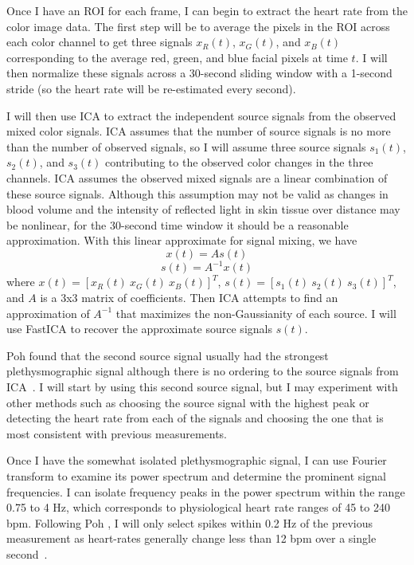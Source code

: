 \documentclass[12pt,twocolumn,letterpaper]{article}
\begin{document}
Once I have an ROI for each frame, I can begin to extract the heart rate from the color image data. The first step will be to average the pixels in the ROI across each color channel to get three signals $x_R(t)$, $x_G(t)$, and $x_B(t)$ corresponding to the average red, green, and blue facial pixels at time $t$. I will then normalize these signals across a 30-second sliding window with a 1-second stride (so the heart rate will be re-estimated every second).

I will then use ICA to extract the independent source signals from the observed mixed color signals. ICA assumes that the number of source signals is no more than the number of observed signals, so I will assume three source signals $s_1(t)$, $s_2(t)$, and $s_3(t)$ contributing to the observed color changes in the three channels. ICA assumes the observed mixed signals are a linear combination of these source signals. Although this assumption may not be valid as changes in blood volume and the intensity of reflected light in skin tissue over distance may be nonlinear, for the 30-second time window it should be a reasonable approximation. With this linear approximate for signal mixing, we have 
	$$x(t) = As(t)$$ 
	$$s(t) = A^{-1}x(t)$$
where $x(t) = [x_R(t)\ x_G(t)\ x_B(t)]^T$, $s(t) = [s_1(t)\ s_2(t)\ s_3(t)]^T$, and $A$ is a 3x3 matrix of coefficients. Then ICA attempts to find an approximation of $A^{-1}$ that maximizes the non-Gaussianity of each source. I will use FastICA to recover the approximate source signals $s(t)$.

Poh \etal found that the second source signal usually had the strongest plethysmographic signal although there is no ordering to the source signals from ICA~\cite{Poh:2010aa}. I will start by using this second source signal, but I may experiment with other methods such as choosing the source signal with the highest peak or detecting the heart rate from each of the signals and choosing the one that is most consistent with previous measurements.

Once I have the somewhat isolated plethysmographic signal, I can use Fourier transform to examine its power spectrum and determine the prominent signal frequencies. I can isolate frequency peaks in the power spectrum within the range 0.75 to 4 Hz, which corresponds to physiological heart rate ranges of 45 to 240 bpm. Following Poh \etal, I will only select spikes within 0.2 Hz of the previous measurement as heart-rates generally change less than 12 bpm over a single second~\cite{Poh:2010aa}.
\end{document}
